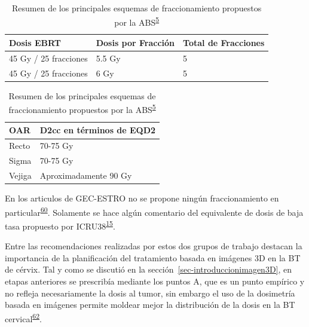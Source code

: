 \documentclass[
  a4paper,
]{scrreprt}
\begin{document}
\begin{table}

\caption{\label{tbl-ABSreportdosis}Resumen de los principales esquemas
de fraccionamiento propuestos por la
ABS\textsuperscript{\protect\hyperlink{ref-viswanathan2012a}{5}}}\begin{minipage}[t]{\linewidth}

{\centering 

\begin{tabular}[t]{lll}
\toprule
Dosis EBRT & Dosis por Fracción & Total de Fracciones\\
\midrule
45 Gy / 25 fracciones & 5.5 Gy & 5\\
45 Gy / 25 fracciones & 6 Gy & 5\\
\bottomrule
\end{tabular}

}

\end{minipage}%
\newline
\begin{minipage}[t]{\linewidth}

{\centering 

\begin{tabular}[t]{ll}
\toprule
OAR & D2cc en términos de EQD2\\
\midrule
Recto & 70-75 Gy\\
Sigma & 70-75 Gy\\
Vejiga & Aproximadamente 90 Gy\\
\bottomrule
\end{tabular}

}

\end{minipage}%

\end{table}

En los articulos de GEC-ESTRO no se propone ningún fraccionamiento en
particular\textsuperscript{\protect\hyperlink{ref-potter2006}{60}}.
Solamente se hace algún comentario del equivalente de dosis de baja tasa
propuesto por
ICRU38\textsuperscript{\protect\hyperlink{ref-ICRU38}{15}}.

Entre las recomendaciones realizadas por estos dos grupos de trabajo
destacan la importancia de la planificación del tratamiento basada en
imágenes 3D en la BT de cérvix. Tal y como se discutió en la
sección~\ref{sec-introduccionimagen3D}, en etapas anteriores se
prescribía mediante los puntos A, que es un punto empírico y no refleja
necesariamente la dosis al tumor, sin embargo el uso de la dosimetría
basada en imágenes permite moldear mejor la distribución de la dosis en
la BT
cervical\textsuperscript{\protect\hyperlink{ref-lindegaard2008}{62}}.
\end{document}
